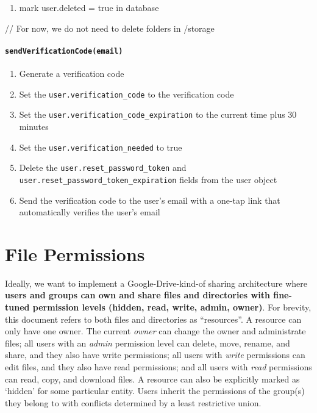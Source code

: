 \begin{enumerate}
\def\labelenumi{\arabic{enumi}.}
\tightlist
\item
  mark user.deleted = true in database
\end{enumerate}

// For now, we do not need to delete folders in /storage

\hypertarget{sendverificationcodeemail}{%
\paragraph{\texorpdfstring{\texttt{sendVerificationCode(email)}}{sendVerificationCode(email)}}\label{sendverificationcodeemail}}

\begin{enumerate}
\def\labelenumi{\arabic{enumi}.}
\item
  Generate a verification code
\item
  Set the \texttt{user.verification\_code} to the verification code
\item
  Set the \texttt{user.verification\_code\_expiration} to the current
  time plus 30 minutes
\item
  Set the \texttt{user.verification\_needed} to true
\item
  Delete the \texttt{user.reset\_password\_token} and
  \texttt{user.reset\_password\_token\_expiration} fields from the user
  object
\item
  Send the verification code to the user's email with a one-tap link
  that automatically verifies the user's email
\end{enumerate}

\hypertarget{file-permissions}{%
\section{File Permissions}\label{file-permissions}}

Ideally, we want to implement a Google-Drive-kind-of sharing
architecture where \textbf{users and groups can own and share files and
directories with fine-tuned permission levels (hidden, read, write,
admin, owner)}. For brevity, this document refers to both files and
directories as ``resources''. A resource can only have one owner. The
current \emph{owner} can change the owner and administrate files; all
users with an \emph{admin} permission level can delete, move, rename,
and share, and they also have write permissions; all users with
\emph{write} permissions can edit files, and they also have read
permissions; and all users with \emph{read} permissions can read, copy,
and download files. A resource can also be explicitly marked as `hidden'
for some particular entity. Users inherit the permissions of the
group(s) they belong to with conflicts determined by a least restrictive
union.

